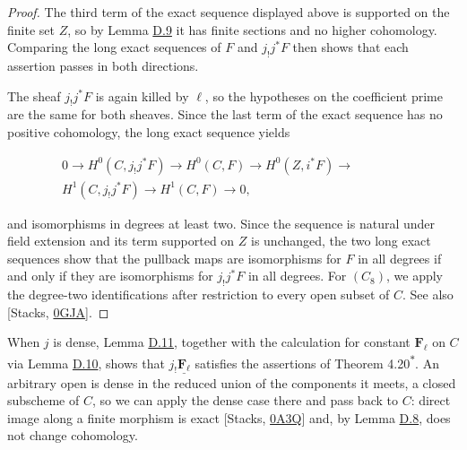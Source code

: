 \documentclass[11pt]{article}
\newcommand{\bpout}[1]{#1\textsuperscript{\hyperlink{bp-outside}{\ensuremath{\ast}}}}
\begin{document}
\begin{proof}[{Proof}]\label{bp211}%
The third term of the exact sequence displayed above is supported on the finite set \(Z\), so by Lemma \hyperref[bp202]{D.9} it has finite sections and no higher cohomology. Comparing the long exact sequences of \(F\) and \(j_!j^*F\) then shows that each assertion passes in both directions.

The sheaf \(j_!j^*F\) is again killed by \(\ell\), so the hypotheses on the coefficient prime are the same for both sheaves. Since the last term of the exact sequence has no positive cohomology, the long exact sequence yields

\[
\begin{split}
0\to H^0(C,j_!j^*F)\to H^0(C,F)\to H^0(Z,i^*F)\to{}\qquad\qquad\\
H^1(C,j_!j^*F)\to H^1(C,F)\to0,
\end{split}
\]

and isomorphisms in degrees at least two. Since the sequence is natural under field extension and its term supported on \(Z\) is unchanged, the two long exact sequences show that the pullback maps are isomorphisms for \(F\) in all degrees if and only if they are isomorphisms for \(j_!j^*F\) in all degrees. For \((C_8)\), we apply the degree-two identifications after restriction to every open subset of \(C\). See also [Stacks, \href{https://stacks.math.columbia.edu/tag/0GJA}{0GJA}].
\end{proof}

\label{bp212}%
When \(j\) is dense, Lemma \hyperref[bp210]{D.11}, together with the calculation for constant \(\mathbf F_\ell\) on \(C\) via Lemma \hyperref[bp205]{D.10}, shows that \(j_!\underline{\mathbf F_\ell}\) satisfies the assertions of Theorem \bpout{4.20}. An arbitrary open is dense in the reduced union of the components it meets, a closed subscheme of \(C\), so we can apply the dense case there and pass back to \(C\): direct image along a finite morphism is exact [Stacks, \href{https://stacks.math.columbia.edu/tag/0A3Q}{0A3Q}] and, by Lemma \hyperref[bp199]{D.8}, does not change cohomology.


\end{document}
